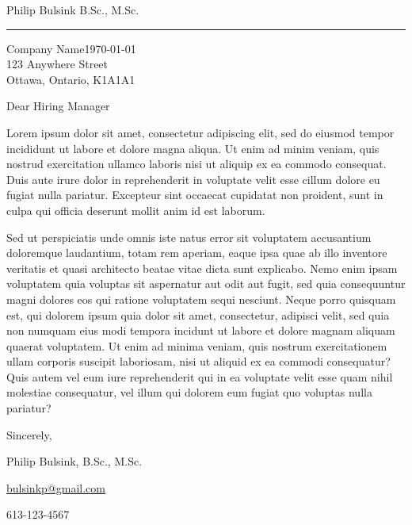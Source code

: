 \documentclass[11pt]{letter}
\begin{document}
    \LARGE{Philip Bulsink }\small{B.Sc., M.Sc.}
    \hrule


    Company Name\hfill \today\\
    123 Anywhere Street\\
    Ottawa, Ontario, K1A1A1

    \baselineskip
    Dear Hiring Manager

    Lorem ipsum dolor sit amet, consectetur adipiscing elit, sed do
eiusmod tempor incididunt ut labore et dolore magna aliqua. Ut enim ad
minim veniam, quis nostrud exercitation ullamco laboris nisi ut aliquip
ex ea commodo consequat. Duis aute irure dolor in reprehenderit in
voluptate velit esse cillum dolore eu fugiat nulla pariatur. Excepteur
sint occaecat cupidatat non proident, sunt in culpa qui officia deserunt
 mollit anim id est laborum.

    Sed ut perspiciatis unde omnis iste natus error sit voluptatem accusantium
doloremque laudantium, totam rem aperiam, eaque ipsa quae ab illo
inventore veritatis et quasi architecto beatae vitae dicta sunt
explicabo. Nemo enim ipsam voluptatem quia voluptas sit aspernatur aut
odit aut fugit, sed quia consequuntur magni dolores eos qui ratione
voluptatem sequi nesciunt. Neque porro quisquam est, qui dolorem ipsum
quia dolor sit amet, consectetur, adipisci velit, sed quia non numquam
eius modi tempora incidunt ut labore et dolore magnam aliquam quaerat
voluptatem. Ut enim ad minima veniam, quis nostrum exercitationem ullam
corporis suscipit laboriosam, nisi ut aliquid ex ea commodi consequatur?
 Quis autem vel eum iure reprehenderit qui in ea voluptate velit esse
quam nihil molestiae consequatur, vel illum qui dolorem eum fugiat quo
voluptas nulla pariatur?

    Sincerely,

    Philip Bulsink, B.Sc., M.Sc.

    \href{mailto:bulsinkp@gmail.com}{bulsinkp@gmail.com}
    \baselineskip

    613-123-4567
\end{document}
